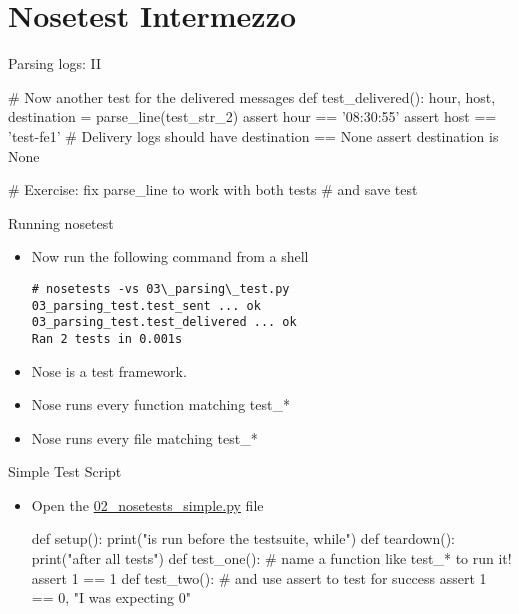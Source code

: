 \section{Nosetest Intermezzo}


\begin{pyframe}{Parsing logs: II}
\begin{pycode}
# Now another test for the delivered messages
def test_delivered():
    hour, host, destination = parse_line(test_str_2)
    assert hour == '08:30:55'
    assert host == 'test-fe1'
    # Delivery logs should have destination == None
    assert destination is None

# Exercise: fix parse_line to work with both tests
#  and save test
\end{pycode}
\end{pyframe}


\begin{pyframe}{Running nosetest}
\begin{itemize}
\item Now run the following command from a shell

\begin{verbatim}
# nosetests -vs 03\_parsing\_test.py  
03_parsing_test.test_sent ... ok        
03_parsing_test.test_delivered ... ok 
Ran 2 tests in 0.001s                 
\end{verbatim}
\item Nose is a test framework.
\item Nose runs every function matching test\_*
\item Nose runs every file matching test\_*
\end{itemize}
\end{pyframe}

\begin{pyframe}{Simple Test Script}
\begin{itemize}
\item Open the \href{https://github.com/ioggstream/python-course/blob/master/python-for-sysadmin/02\_nosetests\_simple.py}{02\_nosetests\_simple.py} file
\begin{pycode}
def setup():
    print("is run before the testsuite, while")
def teardown():
    print("after all tests")
def test_one():
    # name a function like test_* to run it!
    assert 1 == 1 
def test_two():
    # and use assert to test for success
    assert 1 == 0, "I was expecting 0" 
\end{pycode}
\end{itemize}
\end{pyframe}

